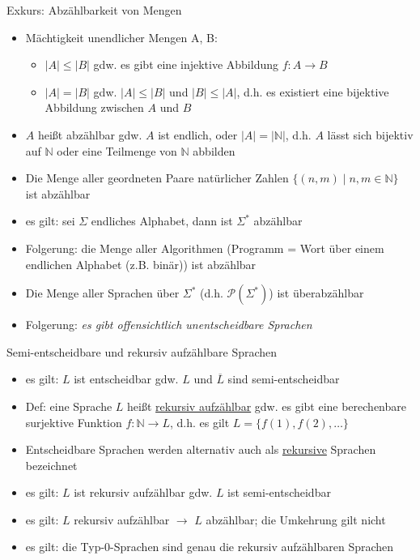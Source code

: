 \begin{frame}{Exkurs: Abzählbarkeit von Mengen}
	\begin{itemize}
		\item Mächtigkeit unendlicher Mengen A, B:
		\begin{itemize}
			\item $|A|\leq |B|$ gdw. es gibt eine injektive Abbildung $f: A \rightarrow B$
			\item $|A| = |B|$ gdw. $|A|\leq |B|$ und $|B|\leq |A|$, d.h. es existiert eine bijektive Abbildung zwischen $A$ und $B$
		\end{itemize}
		\item $A$ heißt abzählbar gdw. $A$ ist endlich, oder $|A|=|\mathbb{N}|$, d.h. $A$ lässt sich bijektiv auf $\mathbb{N}$ oder eine Teilmenge von $\mathbb{N}$ abbilden
		\item Die Menge aller geordneten Paare natürlicher Zahlen $\{(n,m)\mid n, m \in \mathbb{N}\}$ ist abzählbar
		\item es gilt: sei $\Sigma$ endliches Alphabet, dann ist $\Sigma^*$ abzählbar
		\item Folgerung: die Menge aller Algorithmen (Programm = Wort über einem endlichen Alphabet (z.B. binär)) ist abzählbar
		\item Die Menge aller Sprachen über $\Sigma^*$ (d.h. $\mathcal{P}(\Sigma^*)$) ist überabzählbar
		\item Folgerung: \emph{es gibt offensichtlich unentscheidbare Sprachen}
	\end{itemize}
\end{frame}

\begin{frame}{Semi-entscheidbare und rekursiv aufzählbare Sprachen}
	\begin{itemize}
		\item es gilt: $L$ ist entscheidbar gdw. $L$ und $\overline{L}$ sind semi-entscheidbar
		\item Def: eine Sprache $L$ heißt \underline{rekursiv aufzählbar} gdw. es gibt eine berechenbare surjektive Funktion $f: \mathbb{N} \rightarrow L$, d.h. es gilt $L=\{f(1), f(2), \ldots\}$
		\item Entscheidbare Sprachen werden alternativ auch als \underline{rekursive} Sprachen bezeichnet
		\item es gilt: $L$ ist rekursiv aufzählbar gdw. $L$ ist semi-entscheidbar
		\item es gilt: $L$ rekursiv aufzählbar $\rightarrow$ $L$ abzählbar; die Umkehrung gilt nicht
		\item es gilt: die Typ-0-Sprachen sind genau die rekursiv aufzählbaren Sprachen
	\end{itemize}
\end{frame}

